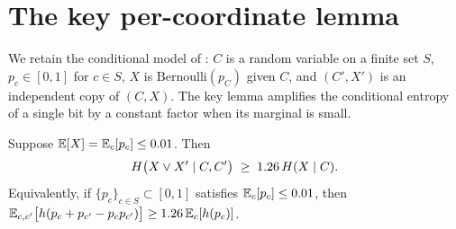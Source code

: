 \section{The key per-coordinate lemma}
\label{sec:key-lemma}

We retain the conditional model of : $C$ is a random variable
on a finite set $S$, $p_c \in [0,1]$ for $c \in S$, $X$ is $\mathrm{Bernoulli}(p_C)$
given $C$, and $(C', X')$ is an independent copy of $(C, X)$. The key lemma
amplifies the conditional entropy of a single bit by a constant factor when its
marginal is small.

\begin{lemma}
\label{lem:single-var}
Suppose $\mathbb{E}[X] = \mathbb{E}_c[p_c] \le 0.01$. Then
\begin{align*}
H\bigl(X \vee X' \mid C, C'\bigr) \;\ge\; 1.26\,H(X \mid C).
\end{align*}
Equivalently, if $\{p_c\}_{c \in S} \subset [0,1]$ satisfies $\mathbb{E}_c[p_c] \le 0.01$,
then $\mathbb{E}_{c,c'}\bigl[h(p_c + p_{c'} - p_c p_{c'})\bigr] \ge 1.26\,\mathbb{E}_c[h(p_c)]$.
\end{lemma}

